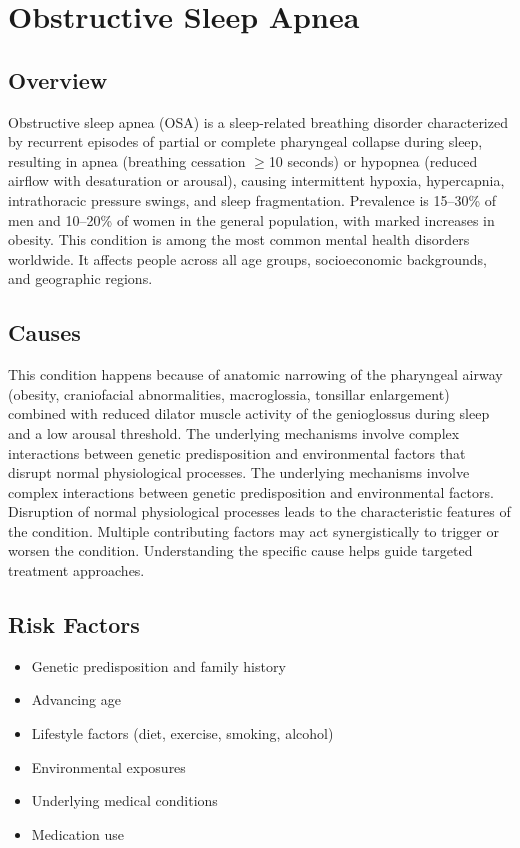 \chapter{Obstructive Sleep Apnea}
\label{sec:Obstructive Sleep Apnea}

\section{Overview}
Obstructive sleep apnea (OSA) is a sleep-related breathing disorder characterized by recurrent episodes of partial or complete pharyngeal collapse during sleep, resulting in apnea (breathing cessation $\ge$10 seconds) or hypopnea (reduced airflow with desaturation or arousal), causing intermittent hypoxia, hypercapnia, intrathoracic pressure swings, and sleep fragmentation. Prevalence is 15--30\% of men and 10--20\% of women in the general population, with marked increases in obesity. This condition is among the most common mental health disorders worldwide. It affects people across all age groups, socioeconomic backgrounds, and geographic regions.
\section{Causes}
This condition happens because of anatomic narrowing of the pharyngeal airway (obesity, craniofacial abnormalities, macroglossia, tonsillar enlargement) combined with reduced dilator muscle activity of the genioglossus during sleep and a low arousal threshold. The underlying mechanisms involve complex interactions between genetic predisposition and environmental factors that disrupt normal physiological processes. The underlying mechanisms involve complex interactions between genetic predisposition and environmental factors. Disruption of normal physiological processes leads to the characteristic features of the condition. Multiple contributing factors may act synergistically to trigger or worsen the condition. Understanding the specific cause helps guide targeted treatment approaches.
\section{Risk Factors}


\begin{itemize}[noitemsep]
  \item Genetic predisposition and family history
  \item Advancing age
  \item Lifestyle factors (diet, exercise, smoking, alcohol)
  \item Environmental exposures
  \item Underlying medical conditions
  \item Medication use
\end{itemize}

